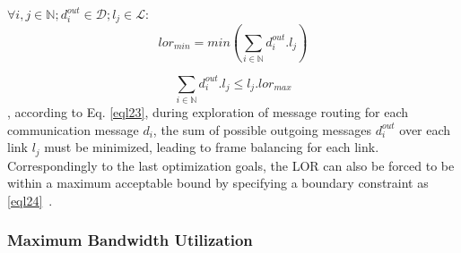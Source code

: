     
        
    
    
    
    
   $\forall i,j \in \mathbb{N}; d_i^{out} \in\mathcal{D}; l_j \in\mathcal{L}$:
    \begin{equation}
    	  lor_{min} =  min (\sum_{i \in \mathbb{N}} d_i^{out}.l_{j})  
    	\label{eql23}
    \end{equation}
    
    \begin{equation}
    	 \sum_{i \in \mathbb{N}} d_i^{out}.l_{j} \leq l_j.lor_{max}  
    	\label{eql24}
    \end{equation}\newline
   , according to Eq. \eqref{eql23}, during exploration of message routing for each communication message $d_i$, the sum of possible outgoing messages $d_i^{out}$ over each link $l_j$ must be minimized, leading to frame balancing for each link. Correspondingly to the last optimization goals, the LOR can also be forced to be within a maximum acceptable bound by specifying a boundary constraint as \eqref{eql24}~\cite{askaripoor2023designer}.
    
    

    
    
    \subsubsection{Maximum Bandwidth Utilization}
    
